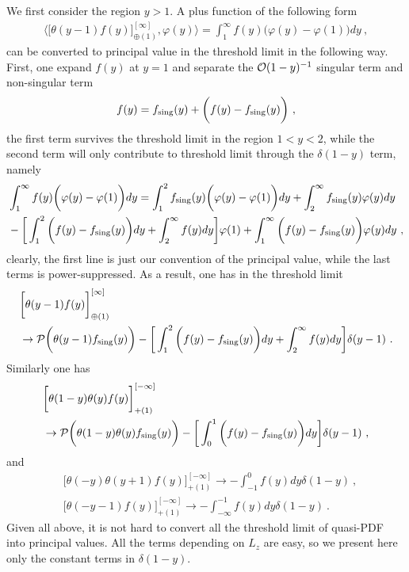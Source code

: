\documentclass[a4paper,11pt]{article}
\begin{document}
We first consider the region $y>1$. A plus function of the following form
\begin{align}
\bigg \langle \bigg[\theta(y-1)f(y)\bigg]^{[\infty]}_{\oplus (1)},\varphi(y) \bigg \rangle=\int_{1}^{\infty}f(y)\bigg(\varphi(y)-\varphi(1)\bigg) dy \ ,
\end{align}
can be converted to principal value in the threshold limit in the following way. First, one expand $f(y)$ at $y=1$ and separate the ${\cal O}(1-y)^{-1}$ singular term and non-singular term
\begin{align}
f(y)=f_{\rm sing}(y)+\bigg(f(y)-f_{\rm sing}(y)\bigg) \ ,
\end{align}
the first term survives the threshold limit in the region $1<y<2$, while the second term will only contribute to threshold limit through the $\delta(1-y)$ term, namely
\begin{align}
&\int_{1}^{\infty}f(y)\bigg(\varphi(y)-\varphi(1)\bigg) dy=\int_{1}^{2}f_{\rm sing}(y)\bigg(\varphi(y)-\varphi(1)\bigg)dy+ 
 \int_{2}^{\infty}f_{\rm sing}(y)\varphi(y)dy \nonumber \\ 
&-\bigg[\int_{1}^{2}\bigg(f(y)-f_{\rm sing}(y)\bigg)dy+\int_{2}^{\infty} f(y) dy\bigg]\varphi(1)+\int_{1}^{\infty}\bigg(f(y)-f_{\rm sing}(y)\bigg)\varphi(y) dy \ , 
\end{align}
clearly, the first line is just our convention of the principal value, while the last terms is power-suppressed. As a result, one has in the threshold limit
\begin{align}
&\bigg[\theta(y-1)f(y)\bigg]^{[\infty]}_{\oplus (1)}\nonumber \\ 
&\rightarrow {\cal P}\bigg(\theta(y-1)f_{\rm sing}(y)\bigg)-\bigg[\int_{1}^{2}\bigg(f(y)-f_{\rm sing}(y)\bigg)dy+\int_{2}^{\infty} f(y) dy\bigg]\delta(y-1) \ .
\end{align}
Similarly one has
\begin{align}
&\bigg[\theta(1-y)\theta(y)f(y)\bigg]^{[-\infty]}_{+(1)}\nonumber \\ 
&\rightarrow {\cal P}\bigg(\theta(1-y)\theta(y)f_{\rm sing}(y)\bigg)-\bigg[\int_{0}^{1}\bigg(f(y)-f_{\rm sing}(y)\bigg)dy\bigg]\delta(y-1) \ ,
\end{align}
and
\begin{align}
&\bigg[\theta(-y)\theta(y+1)f(y)\bigg]^{[-\infty]}_{+(1)}\rightarrow -\int_{-1}^{0}f(y)dy \delta(1-y) \ ,  \\ 
&\bigg[\theta(-y-1)f(y)\bigg]^{[-\infty]}_{+(1)}\rightarrow -\int_{-\infty}^{-1}f(y)dy \delta(1-y)  \  .
\end{align}
Given all above, it is not hard to convert all the threshold limit of quasi-PDF into principal values. All the terms depending on $L_z$ are easy, so we present here only the constant terms in $\delta(1-y)$.
\end{document}

